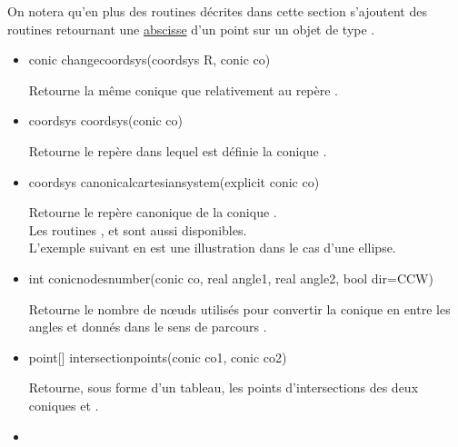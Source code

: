 \documentclass[pdftex]{article}
\begin{document}
On notera qu'en plus des routines décrites dans cette section
s'ajoutent des routines retournant une \href{#section.abscissa}{abscisse}
d'un point sur un objet de type .
\begin{itemize}
\item {}
  \begin{Vcolor}
    conic changecoordsys(coordsys R, conic co)
  \end{Vcolor}
  Retourne la même conique que  relativement au repère .
\item {}
  \begin{Vcolor}
    coordsys coordsys(conic co)
  \end{Vcolor}
  Retourne le repère dans lequel est définie la conique .
\item {}
  \begin{Vcolor}
    coordsys canonicalcartesiansystem(explicit conic co)
  \end{Vcolor}
  Retourne le repère canonique de la conique .\\
  Les routines ,
   et\linebreak
   sont aussi disponibles.\\
  L'exemple suivant en est une illustration dans le cas d'une ellipse.
\item {}
  \begin{Vcolor}
    int conicnodesnumber(conic co, real angle1, real angle2, bool dir=CCW)
  \end{Vcolor}
  Retourne le nombre de n\oe{}uds utilisés pour convertir la
  conique  en  entre les angles 
  et  donnés dans le sens de parcours .
\item {}
  \begin{Vcolor}
    point[] intersectionpoints(conic co1, conic co2)
  \end{Vcolor}
  Retourne, sous forme d'un tableau, les points d'intersections des
  deux coniques  et .
\item {}

\end{itemize}
\end{document}
